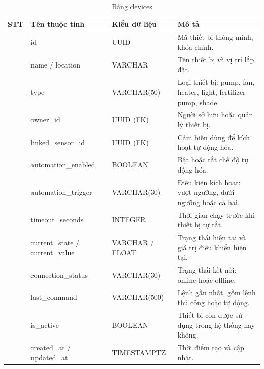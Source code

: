 \documentclass[13pt,a4paper]{extarticle}
\numberwithin{figure}{section}
\numberwithin{table}{section}
\begin{document}
	\begin{table}[H]
		\centering
		\caption{Bảng devices}
		\label{tab:devices}
		\begingroup
		\setlength{\tabcolsep}{3pt}
		\begin{tabularx}{\textwidth}{|>{\centering\arraybackslash}p{1cm}|>{\raggedright\arraybackslash}p{3.8cm}|>{\raggedright\arraybackslash}p{3.2cm}|Y|}
			\hline
			\centering\textbf{STT} & \centering\textbf{Tên thuộc tính} & \centering\textbf{Kiểu dữ liệu} & \centering\arraybackslash\textbf{Mô tả} \\
			 & id & UUID & Mã thiết bị thông minh, khóa chính. \\
			 & name / location & VARCHAR & Tên thiết bị và vị trí lắp đặt. \\
			 & type & VARCHAR(50) & Loại thiết bị: pump, fan, heater, light, fertilizer pump, shade. \\
			 & owner\_id & UUID (FK) & Người sở hữu hoặc quản lý thiết bị. \\
			 & linked\_sensor\_id & UUID (FK) & Cảm biến dùng để kích hoạt tự động hóa. \\
			 & automation\_enabled & BOOLEAN & Bật hoặc tắt chế độ tự động hóa. \\
			 & automation\_trigger & VARCHAR(30) & Điều kiện kích hoạt: vượt ngưỡng, dưới ngưỡng hoặc cả hai. \\
			 & timeout\_seconds & INTEGER & Thời gian chạy trước khi thiết bị tự tắt. \\
			 & current\_state / current\_value & VARCHAR / FLOAT & Trạng thái hiện tại và giá trị điều khiển hiện tại. \\
			 & connection\_status & VARCHAR(30) & Trạng thái kết nối: online hoặc offline. \\
			 & last\_command & VARCHAR(500) & Lệnh gần nhất, gồm lệnh thủ công hoặc tự động. \\
			 & is\_active & BOOLEAN & Thiết bị còn được sử dụng trong hệ thống hay không. \\
			 & created\_at / updated\_at & TIMESTAMPTZ & Thời điểm tạo và cập nhật. \\
			\hline
		\end{tabularx}
		\endgroup
	\end{table}
	
\end{document}
